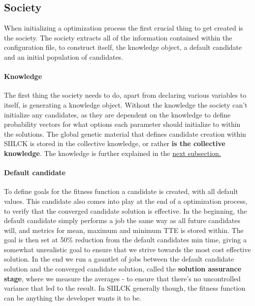 \documentclass[a4paper,english]{report}
\begin{document}
		\subsection{Society}
		\label{sec:society}
		When initializing a optimization process the first crucial thing to get created is the society. The society extracts all of the information contained within the configuration file, to construct itself, the knowledge object, a default candidate and an initial population of candidates.
		\paragraph{Knowledge}
		The first thing the society needs to do, apart from declaring various variables to itself, is generating a knowledge object. Without the knowledge the society can't initialize any candidates, as they are dependent on the knowledge to define probability vectors for what options each parameter should initialize to within the solutions. The global genetic material that defines candidate creation within SIILCK is stored in the collective knowledge, or rather \textbf{is the collective knowledge}. The knowledge is further explained in the \hyperref[knowledge]{next subsection.} 
		\paragraph{Default candidate}
		To define goals for the fitness function a candidate is created, with all default values. This candidate also comes into play at the end of a optimization process, to verify that the converged candidate solution is effective. In the beginning, the default candidate simply performs a job the same way as all future candidates will, and metrics for mean, maximum and minimum TTE is stored within. The goal is then set at 50\% reduction from the default candidates min time, giving a somewhat unrealistic goal to ensure that we strive towards the most cost effective solution. In the end we run a gauntlet of jobs between the default candidate solution and the converged candidate solution, called the \textbf{solution assurance stage}, where we measure the averages - to ensure that there's no uncontrolled variance that led to the result. In SIILCK generally though, the fitness function can be anything the developer wants it to be.
		\pagebreak
\end{document}
